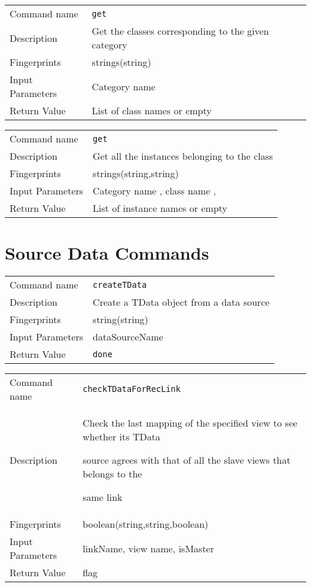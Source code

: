 \noindent
\begin{tabular}{l|p{5in}}
\hline
Command name &{\tt get }\\ 
Description &
 Get the classes corresponding to the given category 
 	\\
Fingerprints & strings(string)\\
Input Parameters& Category name \\
Return Value& List of class names or empty \\
\hline
\end{tabular}
\bigskip

\noindent
\begin{tabular}{l|p{5in}}
\hline
Command name &{\tt get }\\ 
Description &
 Get all the instances belonging to the class 
 	\\
Fingerprints & strings(string,string)\\
Input Parameters& Category name , class name , \\
Return Value& List of instance names or empty \\
\hline
\end{tabular}
\bigskip


\section{Source Data Commands}
\noindent
\begin{tabular}{l|p{5in}}
\hline
Command name &{\tt createTData }\\ 
Description &
Create a TData object from a data source
 	\\
Fingerprints & string(string)\\
Input Parameters&dataSourceName\\
Return Value&{\tt done}\\
\hline
\end{tabular}
\bigskip

\noindent
\begin{tabular}{l|p{5in}}
\hline
Command name &{\tt checkTDataForRecLink }\\ 
Description &
Check the last mapping of the specified view to see whether its TData
 
source agrees with that of all the slave views that belongs to the 
 
same link
 	\\
Fingerprints & boolean(string,string,boolean)\\
Input Parameters&linkName, view name, isMaster\\
Return Value&flag\\
\hline
\end{tabular}
\bigskip

